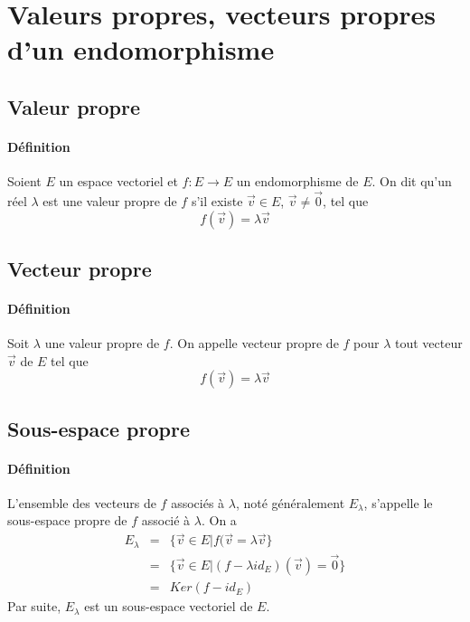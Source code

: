 %
%
\section{Valeurs propres, vecteurs propres d'un endomorphisme}
%
%
%
\subsection{Valeur propre}
%
\paragraph{Définition} Soient $E$ un espace vectoriel et $f: E \rightarrow E$ un endomorphisme de $E$. On dit qu'un réel $\lambda$ est une valeur propre de $f$ s'il existe $\vec{v} \in E$, $\vec{v} \neq \vec{0}$, tel que 
$$f(\vec{v}) = \lambda\vec{v}$$

%
\subsection{Vecteur propre}
%
\paragraph{Définition} Soit $\lambda$ une valeur propre de $f$. On appelle vecteur propre de $f$ pour $\lambda$ tout vecteur $\vec{v}$ de $E$ tel que 
$$f(\vec{v}) = \lambda \vec{v}$$

%
\subsection{Sous-espace propre}
%
\paragraph{Définition} L'ensemble des vecteurs de $f$ associés à $\lambda$, noté généralement $E_\lambda$, s'appelle le sous-espace propre de $f$ associé à $\lambda$. On a
\begin{eqnarray*}
  E_{\lambda} &=& \{\vec{v} \in E \vert f(\vec{v} = \lambda\vec{v} \} \\
    &=& \{\vec{v} \in E \vert (f-\lambda id_E)(\vec{v}) = \vec{0} \} \\
    &=& Ker(f-id_E)
\end{eqnarray*}
Par suite, $E_\lambda$ est un sous-espace vectoriel de $E$.

